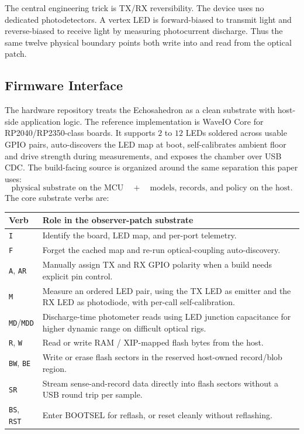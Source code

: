 \documentclass[11pt]{article}
\theoremstyle{remark}
\theoremstyle{plain}
\begin{document}
The central engineering trick is TX/RX reversibility. The device uses no dedicated photodetectors. A vertex LED is forward-biased to transmit light and reverse-biased to receive light by measuring photocurrent discharge. Thus the same twelve physical boundary points both write into and read from the optical patch.

\subsection{Firmware Interface}

The hardware repository treats the Echosahedron as a clean substrate with host-side application logic. The reference implementation is WaveIO Core for RP2040/RP2350-class boards. It supports \(2\) to \(12\) LEDs soldered across usable GPIO pairs, auto-discovers the LED map at boot, self-calibrates ambient floor and drive strength during measurements, and exposes the chamber over USB CDC. The build-facing source is organized around the same separation this paper uses:
\[
\boxed{
\text{physical substrate on the MCU}
\quad+\quad
\text{models, records, and policy on the host}.
}
\]
The core substrate verbs are:

\begin{longtable}{L{0.20\textwidth}L{0.70\textwidth}}
\toprule
\textbf{Verb} & \textbf{Role in the observer-patch substrate} \\
\midrule
\endhead
\texttt{I} & Identify the board, LED map, and per-port telemetry. \\
\texttt{F} & Forget the cached map and re-run optical-coupling auto-discovery. \\
\texttt{A}, \texttt{AR} & Manually assign TX and RX GPIO polarity when a build needs explicit pin control. \\
\texttt{M} & Measure an ordered LED pair, using the TX LED as emitter and the RX LED as photodiode, with per-call self-calibration. \\
\texttt{MD}/\texttt{MDD} & Discharge-time photometer reads using LED junction capacitance for higher dynamic range on difficult optical rigs. \\
\texttt{R}, \texttt{W} & Read or write RAM / XIP-mapped flash bytes from the host. \\
\texttt{BW}, \texttt{BE} & Write or erase flash sectors in the reserved host-owned record/blob region. \\
\texttt{SR} & Stream sense-and-record data directly into flash sectors without a USB round trip per sample. \\
\texttt{BS}, \texttt{RST} & Enter BOOTSEL for reflash, or reset cleanly without reflashing. \\
\bottomrule
\end{longtable}
\end{document}
